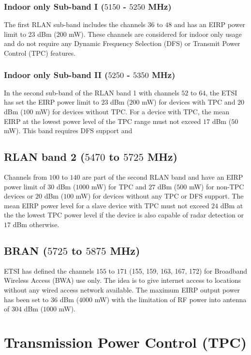 \subsubsection{Indoor only Sub-band I ($5150$ - $5250$ MHz)}
The first RLAN sub-band includes the channels $36$ to $48$ and has an EIRP power limit to $23$ dBm ($200$ mW). These channels are considered for indoor only usage and do not require any Dynamic Frequency Selection (DFS) or Transmit Power Control (TPC) features. 

\subsubsection{Indoor only Sub-band II ($5250$ - $5350$ MHz)}
In the second sub-band of the RLAN band 1 with channels $52$ to $64$, the ETSI has set the EIRP power limit to $23$ dBm ($200$ mW) for devices with TPC and $20$ dBm ($100$ mW) for devices without TPC. For a device with TPC, the mean EIRP at the lowest power level of the TPC range must not exceed $17$ dBm ($50$ mW). This band requires DFS support and 

\subsection{RLAN band 2 ($5470$ to $5725$ MHz)}

Channels from $100$ to $140$ are part of the second RLAN band and have an EIRP power limit of $30$ dBm ($1000$ mW) for TPC and $27$ dBm ($500$ mW) for non-TPC devices or $20$ dBm ($100$ mW) for devices without any TPC or DFS support. The mean EIRP power level for a slave device with TPC must not exceed $24$ dBm at the the lowest TPC power level if the device is also capable of radar detection or $17$ dBm otherwise. 

\subsection{BRAN ($5725$ to $5875$ MHz)}

ETSI has defined the channels $155$ to $171$ (155, 159, 163, 167, 172) for Broadband Wireless Access (BWA) use only. The idea is to give internet access to locations without any wired access network available. The maximum EIRP output power has been set to $36$ dBm ($4000$ mW) with the limitation of RF power into antenna of $304$ dBm ($1000$ mW).


\section{Transmission Power Control (TPC)}

